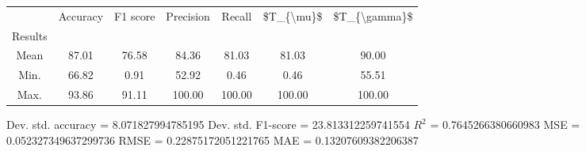 \begin{tabular}{|c|c|c|c|c|c|c|}
\toprule
{} &  Accuracy &  F1 score &  Precision &  Recall &  \$T\_\{\textbackslash mu\}\$ &  \$T\_\{\textbackslash gamma\}\$ \\
Results &           &           &            &         &            &               \\
\hline
Mean    &     87.01 &     76.58 &      84.36 &   81.03 &      81.03 &         90.00 \\
Min.    &     66.82 &      0.91 &      52.92 &    0.46 &       0.46 &         55.51 \\
Max.    &     93.86 &     91.11 &     100.00 &  100.00 &     100.00 &        100.00 \\
\bottomrule
\end{tabular}

 Dev. std. accuracy = 8.071827994785195
 Dev. std. F1-score = 23.813312259741554
 $R^2$ = 0.7645266380660983
 MSE = 0.052327349637299736
 RMSE = 0.22875172051221765
 MAE = 0.13207609382206387